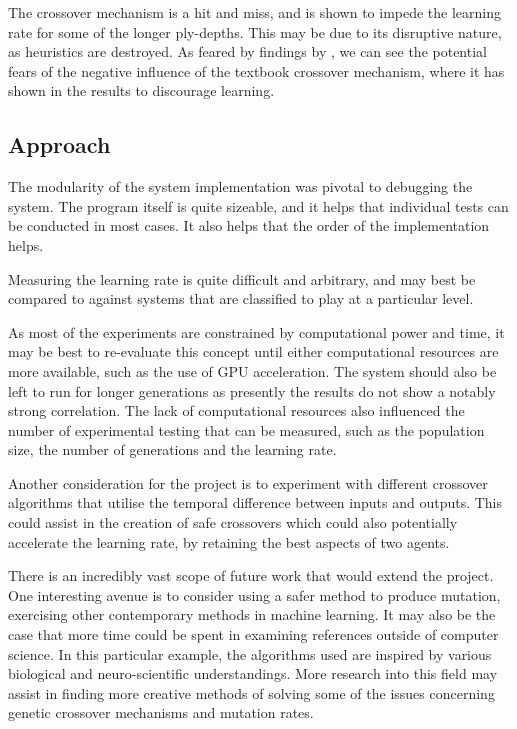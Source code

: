 \documentclass[12pt,a4paper]{article}
\begin{document}
    The crossover mechanism is a hit and miss, and is shown to impede the learning rate for some of the longer ply-depths. This may be due to its disruptive nature, as heuristics are destroyed. As feared by findings by \cite{emmanouilidis_comparison_2000}, we can see the potential fears of the negative influence of the textbook crossover mechanism, where it has shown in the results to discourage learning.

    \subsection{Approach}
        The modularity of the system implementation was pivotal to debugging the system. The program itself is quite sizeable, and it helps that individual tests can be conducted in most cases. It also helps that the order of the implementation helps.

        Measuring the learning rate is quite difficult and arbitrary, and may best be compared to against systems that are classified to play at a particular level. 

        As most of the experiments are constrained by computational power and time, it may be best to re-evaluate this concept until either computational resources are more available, such as the use of GPU acceleration. The system should also be left to run for longer generations as presently the results do not show a notably strong correlation. The lack of computational resources also influenced the number of experimental testing that can be measured, such as the population size, the number of generations and the learning rate. 
        
        Another consideration for the project is to experiment with different crossover algorithms that utilise the temporal difference between inputs and outputs. This could assist in the creation of safe crossovers which could also potentially accelerate the learning rate, by retaining the best aspects of two agents.
        
        There is an incredibly vast scope of future work that would extend the project. One interesting avenue is to consider using a safer method to produce mutation, exercising other contemporary methods in machine learning. It may also be the case that more time could be spent in examining references outside of computer science. In this particular example, the algorithms used are inspired by various biological and neuro-scientific understandings. More research into this field may assist in finding more creative methods of solving some of the issues concerning genetic crossover mechanisms and mutation rates.
\end{document}
